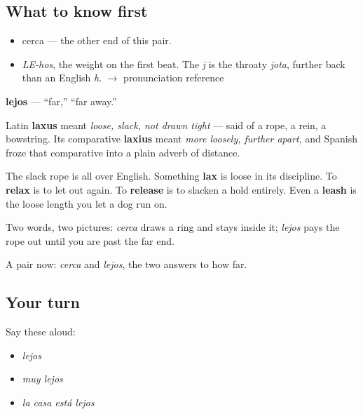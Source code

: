 \subsection*{What to know first}
\begin{itemize}
\raggedright
  \item cerca — the other end of this pair.
\end{itemize}

\begin{sounds}
\begin{itemize}
\raggedright
  \item \emph{LE-hos}, the weight on the first beat. The \emph{j} is the throaty \emph{jota}, further back than an English \emph{h}. $\to$ pronunciation reference
\end{itemize}
\end{sounds}

\begin{cousinweb}
\textbf{lejos} — \textquotedblleft{}far,\textquotedblright{} \textquotedblleft{}far away.\textquotedblright{}

Latin \textbf{laxus} meant \emph{loose, slack, not drawn tight} — said of a rope, a rein, a bowstring. Its comparative \textbf{laxius} meant \emph{more loosely, further apart}, and Spanish froze that comparative into a plain adverb of distance.

The slack rope is all over English. Something \textbf{lax} is loose in its discipline. To \textbf{relax} is to let out again. To \textbf{release} is to slacken a hold entirely. Even a \textbf{leash} is the loose length you let a dog run on.

Two words, two pictures: \emph{cerca} draws a ring and stays inside it; \emph{lejos} pays the rope out until you are past the far end.
\end{cousinweb}

\begin{grammarlens}[title={What you've built}]
A pair now: \emph{cerca} and \emph{lejos}, the two answers to how far.
\end{grammarlens}

\subsection*{Your turn}
Say these aloud:

\begin{itemize}
\raggedright
  \item \emph{lejos}
  \item \emph{muy lejos}
  \item \emph{la casa está lejos}
\end{itemize}

